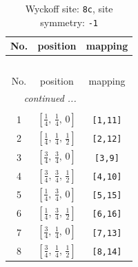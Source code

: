 \documentclass[fleqn,8pt]{jsarticle}
\begin{document}
\renewcommand{\arraystretch}{1.2}
\begin{longtable}{ccc}
\caption{Wyckoff site: {\tt 8c}, site symmetry: {\tt -1}}
 \\
 \hline \hline
No. & position & mapping \\ \hline \endfirsthead

\multicolumn{2}{l}{\tablename\ \thetable{}} \\
 \hline \hline
No. & position & mapping \\ \hline \endhead

 \hline \hline
\multicolumn{2}{r}{\footnotesize\it continued ...} \\ \endfoot

 \hline \hline
\multicolumn{2}{r}{} \\ \endlastfoot

1 & $\left[ \frac{1}{4},\, \frac{1}{4},\, 0 \right]$ & {\tt [1,11]} \\ \hline
2 & $\left[ \frac{1}{4},\, \frac{1}{4},\, \frac{1}{2} \right]$ & {\tt [2,12]} \\ \hline
3 & $\left[ \frac{3}{4},\, \frac{3}{4},\, 0 \right]$ & {\tt [3,9]} \\ \hline
4 & $\left[ \frac{3}{4},\, \frac{3}{4},\, \frac{1}{2} \right]$ & {\tt [4,10]} \\ \hline
5 & $\left[ \frac{1}{4},\, \frac{3}{4},\, 0 \right]$ & {\tt [5,15]} \\ \hline
6 & $\left[ \frac{1}{4},\, \frac{3}{4},\, \frac{1}{2} \right]$ & {\tt [6,16]} \\ \hline
7 & $\left[ \frac{3}{4},\, \frac{1}{4},\, 0 \right]$ & {\tt [7,13]} \\ \hline
8 & $\left[ \frac{3}{4},\, \frac{1}{4},\, \frac{1}{2} \right]$ & {\tt [8,14]} \\
\end{longtable}
\renewcommand{\arraystretch}{1.2}
\end{document}
